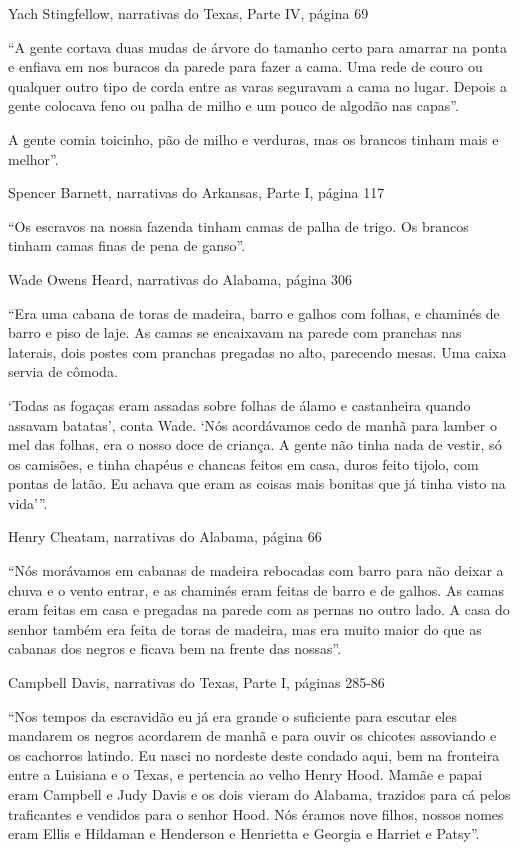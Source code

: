 Yach Stingfellow, narrativas do Texas, Parte IV, página 69

``A gente cortava duas mudas de árvore do tamanho certo para amarrar na
ponta e enfiava em nos buracos da parede para fazer a cama. Uma rede de
couro ou qualquer outro tipo de corda entre as varas seguravam a cama no
lugar. Depois a gente colocava feno ou palha de milho e um pouco de
algodão nas capas''.

A gente comia toicinho, pão de milho e verduras, mas os brancos tinham
mais e melhor''.

Spencer Barnett, narrativas do Arkansas, Parte I, página 117

``Os escravos na nossa fazenda tinham camas de palha de trigo. Os
brancos tinham camas finas de pena de ganso''.

Wade Owens Heard, narrativas do Alabama, página 306

``Era uma cabana de toras de madeira, barro e galhos com folhas, e
chaminés de barro e piso de laje. As camas se encaixavam na parede com
pranchas nas laterais, dois postes com pranchas pregadas no alto,
parecendo mesas. Uma caixa servia de cômoda.

`Todas as fogaças eram assadas sobre folhas de álamo e castanheira
quando assavam batatas', conta Wade. `Nós acordávamos cedo de manhã para
lamber o mel das folhas, era o nosso doce de criança. A gente não tinha
nada de vestir, só os camisões, e tinha chapéus e chancas feitos em
casa, duros feito tijolo, com pontas de latão. Eu achava que eram as
coisas mais bonitas que já tinha visto na vida'''.

Henry Cheatam, narrativas do Alabama, página 66

``Nós morávamos em cabanas de madeira rebocadas com barro para não
deixar a chuva e o vento entrar, e as chaminés eram feitas de barro e de
galhos. As camas eram feitas em casa e pregadas na parede com as pernas
no outro lado. A casa do senhor também era feita de toras de madeira,
mas era muito maior do que as cabanas dos negros e ficava bem na frente
das nossas''.

Campbell Davis, narrativas do Texas, Parte I, páginas 285-86

``Nos tempos da escravidão eu já era grande o suficiente para escutar
eles mandarem os negros acordarem de manhã e para ouvir os chicotes
assoviando e os cachorros latindo. Eu nasci no nordeste deste condado
aqui, bem na fronteira entre a Luisiana e o Texas, e pertencia ao velho
Henry Hood. Mamãe e papai eram Campbell e Judy Davis e os dois vieram do
Alabama, trazidos para cá pelos traficantes e vendidos para o senhor
Hood. Nós éramos nove filhos, nossos nomes eram Ellis e Hildaman e
Henderson e Henrietta e Georgia e Harriet e Patsy''.

